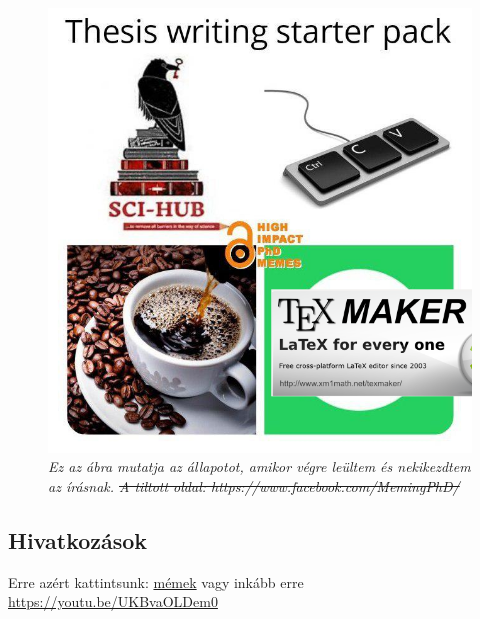 \documentclass[12pt,a4paper,titlepage,twoside]{article} %
\numberwithin{equation}{section}
\numberwithin{figure}{section}
\numberwithin{table}{subsection}
\begin{document}
\begin{spacing}{1.5}
\begin{figure}[!hbt]
	\begin{center}
		\includegraphics[scale=0.5]{figs/72876529_2457717027805946_1450758038972530688_n.png}
	\end{center}
	\caption{\textit{Ez az ábra mutatja az állapotot, amikor végre leültem és nekikezdtem az írásnak. \st{A tiltott oldal: https://www.facebook.com/MemingPhD/}}}
	\label{fig:starterpack}
\end{figure}

\lipsum[1-7]

\subsection{Hivatkozások}

Erre azért kattintsunk: \href{https://www.facebook.com/MemingPhD/}{mémek} vagy inkább erre \url{https://youtu.be/UKBvaOLDem0}


\end{spacing}
\end{document}

